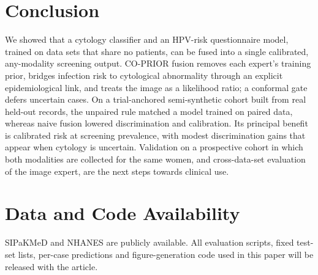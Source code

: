 \documentclass[lettersize,journal]{IEEEtran}
\begin{document}
\section{Conclusion}
We showed that a cytology classifier and an HPV-risk questionnaire model, trained on data sets that share no patients, can be fused into a single calibrated, any-modality screening output. CO-PRIOR fusion removes each expert's training prior, bridges infection risk to cytological abnormality through an explicit epidemiological link, and treats the image as a likelihood ratio; a conformal gate defers uncertain cases. On a trial-anchored semi-synthetic cohort built from real held-out records, the unpaired rule matched a model trained on paired data, whereas naive fusion lowered discrimination and calibration. Its principal benefit is calibrated risk at screening prevalence, with modest discrimination gains that appear when cytology is uncertain. Validation on a prospective cohort in which both modalities are collected for the same women, and cross-data-set evaluation of the image expert, are the next steps towards clinical use.

\section*{Data and Code Availability}
SIPaKMeD and NHANES are publicly available. All evaluation scripts, fixed test-set lists, per-case predictions and figure-generation code used in this paper will be released with the article.

\clearpage   %


\end{document}
